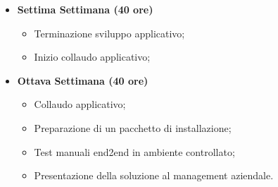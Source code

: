 {\begin{itemize}
\begin{itemize}
        	\item Sviluppo applicativo;       	
            \item Scrittura test.
        \end{itemize}
        \item \textbf{Settima Settimana (40 ore)} 
        \begin{itemize}
        	\item Terminazione sviluppo applicativo;
        	\item Inizio collaudo applicativo;            
        \end{itemize}
        \item \textbf{Ottava Settimana (40 ore)} 
        \begin{itemize}
        	\item Collaudo applicativo;
            \item Preparazione di un pacchetto di installazione;
            \item Test manuali end2end in ambiente
controllato;
			\item Presentazione della soluzione al management aziendale.
        \end{itemize}
    \end{itemize}
}

\newcommand{\totaleOre}{}

\newcommand{\obiettiviObbligatori}{
	 \item \underline{\textit{O01}}: prototipo dell'applicativo funzionante in ambiente Windows;
	 \item \underline{\textit{O02}}: documentazione chiara ed appropriata mirata all'utilizzo e al mantenimento del prodotto;	 
}

\newcommand{\obiettiviDesiderabili}{
	 \item \underline{\textit{D01}}: possibilità di creare tipologie di utenze differenti;
	 \item \underline{\textit{D02}}: presenza di test di unità esaustivi;
}

\newcommand{\obiettiviFacoltativi}{
	 \item \underline{\textit{F01}}: applicativo funzionante per MacOS e Linux;
}